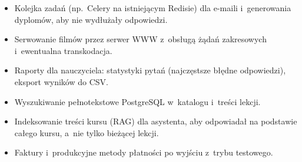 \begin{itemize}
  \item Kolejka zadań (np.\ Celery na istniejącym Redisie) dla e-maili i~generowania
        dyplomów, aby nie wydłużały odpowiedzi.
  \item Serwowanie filmów przez serwer WWW z~obsługą żądań zakresowych i~ewentualna
        transkodacja.
  \item Raporty dla nauczyciela: statystyki pytań (najczęstsze błędne odpowiedzi),
        eksport wyników do CSV.
  \item Wyszukiwanie pełnotekstowe PostgreSQL w~katalogu i~treści lekcji.
  \item Indeksowanie treści kursu (RAG) dla asystenta, aby odpowiadał na podstawie całego
        kursu, a~nie tylko bieżącej lekcji.
  \item Faktury i~produkcyjne metody płatności po wyjściu z~trybu testowego.
\end{itemize}
